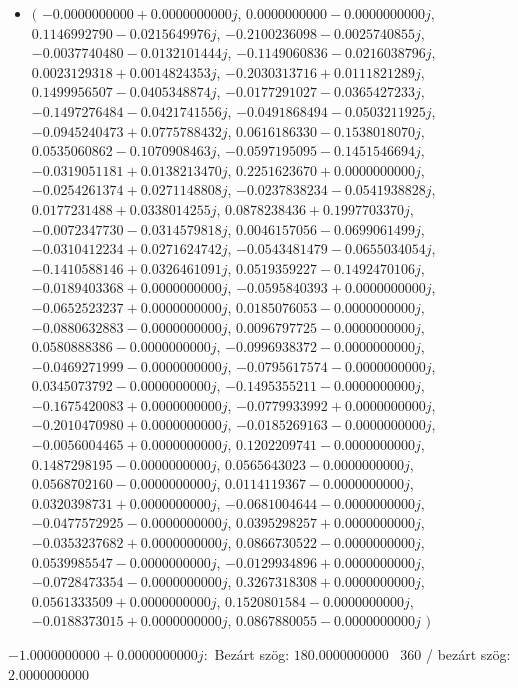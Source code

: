 \documentclass[14pt,a4paper]{article}
\begin{document}
\begin{itemize}
\item
$\big($
$-0.0000000000+0.0000000000j$, $0.0000000000-0.0000000000j$, $0.1146992790-0.0215649976j$, $-0.2100236098-0.0025740855j$, $-0.0037740480-0.0132101444j$, $-0.1149060836-0.0216038796j$, $0.0023129318+0.0014824353j$, $-0.2030313716+0.0111821289j$, $0.1499956507-0.0405348874j$, $-0.0177291027-0.0365427233j$, $-0.1497276484-0.0421741556j$, $-0.0491868494-0.0503211925j$, $-0.0945240473+0.0775788432j$, $0.0616186330-0.1538018070j$, $0.0535060862-0.1070908463j$, $-0.0597195095-0.1451546694j$, $-0.0319051181+0.0138213470j$, $0.2251623670+0.0000000000j$, $-0.0254261374+0.0271148808j$, $-0.0237838234-0.0541938828j$, $0.0177231488+0.0338014255j$, $0.0878238436+0.1997703370j$, $-0.0072347730-0.0314579818j$, $0.0046157056-0.0699061499j$, $-0.0310412234+0.0271624742j$, $-0.0543481479-0.0655034054j$, $-0.1410588146+0.0326461091j$, $0.0519359227-0.1492470106j$, $-0.0189403368+0.0000000000j$, $-0.0595840393+0.0000000000j$, $-0.0652523237+0.0000000000j$, $0.0185076053-0.0000000000j$, $-0.0880632883-0.0000000000j$, $0.0096797725-0.0000000000j$, $0.0580888386-0.0000000000j$, $-0.0996938372-0.0000000000j$, $-0.0469271999-0.0000000000j$, $-0.0795617574-0.0000000000j$, $0.0345073792-0.0000000000j$, $-0.1495355211-0.0000000000j$, $-0.1675420083+0.0000000000j$, $-0.0779933992+0.0000000000j$, $-0.2010470980+0.0000000000j$, $-0.0185269163-0.0000000000j$, $-0.0056004465+0.0000000000j$, $0.1202209741-0.0000000000j$, $0.1487298195-0.0000000000j$, $0.0565643023-0.0000000000j$, $0.0568702160-0.0000000000j$, $0.0114119367-0.0000000000j$, $0.0320398731+0.0000000000j$, $-0.0681004644-0.0000000000j$, $-0.0477572925-0.0000000000j$, $0.0395298257+0.0000000000j$, $-0.0353237682+0.0000000000j$, $0.0866730522-0.0000000000j$, $0.0539985547-0.0000000000j$, $-0.0129934896+0.0000000000j$, $-0.0728473354-0.0000000000j$, $0.3267318308+0.0000000000j$, $0.0561333509+0.0000000000j$, $0.1520801584-0.0000000000j$, $-0.0188373015+0.0000000000j$, $0.0867880055-0.0000000000j$
$\big)$
\end{itemize}
$-1.0000000000+0.0000000000j$:\
Bezárt szög: $180.0000000000$ \
360 / bezárt szög: $2.0000000000$\
\end{document}

